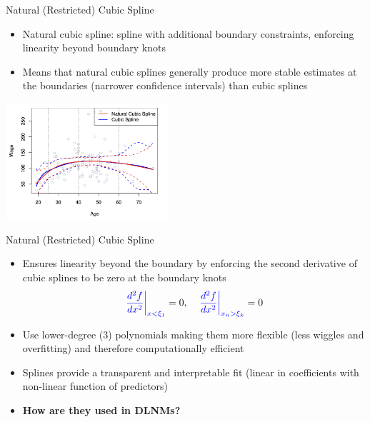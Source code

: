 \documentclass[english]{beamer}
\newcommand{\alertblue}[1]{{\color{blue}#1}}
\begin{document}
\begin{frame}{Natural (Restricted) Cubic Spline}
    \begin{itemize}
        \item \alertblue{Natural cubic spline}: spline with \alertblue{additional boundary constraints, enforcing linearity beyond boundary knots} 
        \item Means that natural cubic splines generally produce more \alertblue{stable estimates at the boundaries (narrower confidence intervals)} than cubic splines
    \end{itemize}
    \centering
    \includegraphics[width=6cm]{images/cubic_vs_natural.png}
\end{frame}
\begin{frame}{Natural (Restricted) Cubic Spline}
    \begin{itemize}
        \item Ensures linearity beyond the boundary by \alertblue{enforcing the second derivative of cubic splines to be zero at the boundary knots}
        \begin{equation*}
            \alertblue{\left. \frac{d^2 f}{d x^2} \right|_{x<\xi_1}} = 0, \quad
            \alertblue{\left. \frac{d^2 f}{d x^2} \right|_{x_n>\xi_k}} = 0
        \end{equation*}
        \item Use lower-degree (\alertblue{3}) polynomials making them more flexible (\alertblue{less wiggles and overfitting}) and therefore \alertblue{computationally efficient}
        \item Splines provide a transparent and interpretable fit (\alertblue{linear in coefficients with non-linear function of predictors})
        \vspace{0.5cm}
        \item \textbf{\alertblue{How are they used in DLNMs?}}
    \end{itemize}
\end{frame}
\end{document}
